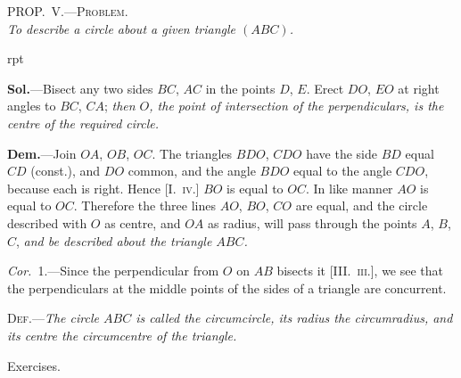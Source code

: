 \documentclass[oneside]{book}
\newcounter{wrapwidth}
\newcommand\myprop[2]{
\bigskip\Needspace*{4\baselineskip}\begin{center}\textsc{#1}\\\medskip\emph{#2}\par\end{center}
}
\newcommand\exhead[1]{
\Needspace*{5\baselineskip}\begin{center}
\textsf{#1}
\end{center}
}
\newcommand\imgflow[3]{
\setcounter{wrapwidth}{#1}

\begin{wrapfigure}[#2]{r}{\value{wrapwidth}pt}
\begin{center}
\vspace{-0.3in}

\end{center}
\end{wrapfigure}
}
\begin{document}
\myprop{PROP\@.~V.---Problem.}{To describe a circle about a given triangle $(ABC)$.}


\imgflow{108}{10}{f156}

\textbf{Sol.}---Bisect any two sides $BC$, $AC$ in the points $D$, $E$.
Erect $DO$, $EO$ at right angles to $BC$,
$CA$; \emph{then $O$, the point of intersection
of the perpendiculars, is the centre
of the required circle.}

\textbf{Dem.}---Join $OA$, $OB$, $OC$. The
triangles $BDO$, $CDO$ have the side
$BD$ equal $CD$ (const.), and $DO$ common,
and the angle $BDO$ equal to
the angle $CDO$, because each is
right. Hence [I.~\textsc{iv.}] $BO$ is equal to $OC$. In like
manner $AO$ is equal to $OC$. Therefore the three lines
$AO$, $BO$, $CO$ are equal, and the circle described with
$O$ as centre, and $OA$ as radius, will pass through the
points $A$, $B$, $C$, \emph{and be described about the triangle $ABC$.}

\emph{Cor.}~1.---Since the perpendicular from $O$ on $AB$ bisects
it [III\@.~\textsc{iii.}], we see that the perpendiculars at the
middle points of the sides of a triangle are concurrent.

\textsc{Def.}---\textit{The circle $ABC$ is called the circumcircle, its
radius the circumradius, and its centre the circumcentre
of the triangle.}

\exhead{Exercises.}
\end{document}
